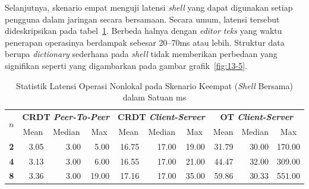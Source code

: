 Selanjutnya, skenario empat menguji latensi \textit{shell} yang dapat digunakan setiap pengguna dalam jaringan secara bersamaan. Secara umum, latensi tersebut dideskripsikan pada tabel~\ref{tab:latency-4}. Berbeda halnya dengan \textit{editor teks} yang waktu penerapan operasinya berdampak sebesar 20--70ms atau lebih. Struktur data berupa \textit{dictionary} sederhana pada \textit{shell} tidak memberikan perbedaan yang signifikan seperti yang digambarkan pada gambar grafik~\ref{fig:13-5}.

\begin{table}[H]
 \centering

 \caption{Statistik Latensi Operasi Nonlokal pada Skenario Keempat (\textit{Shell} Bersama) dalam Satuan ms}
 \label{tab:latency-4}
 \begin{tabular}{|c|rrr|rrr|rrr|}
  \hline
\multirow{2}{*}{$n$} & \multicolumn{3}{c|}{\textbf{CRDT \textit{Peer-To-Peer}}} & \multicolumn{3}{c|}{\textbf{CRDT \textit{Client-Server}}} & \multicolumn{3}{c|}{\textbf{OT \textit{Client-Server}}} \\ \cline{2-10}
 & \multicolumn{1}{c|}{Mean} & \multicolumn{1}{c|}{Median} & \multicolumn{1}{c|}{Max} & \multicolumn{1}{c|}{Mean} & \multicolumn{1}{c|}{Median} & \multicolumn{1}{c|}{Max} & \multicolumn{1}{c|}{Mean} & \multicolumn{1}{c|}{Median} & \multicolumn{1}{c|}{Max} \\ \hline
\textbf{2} & \multicolumn{1}{r|}{3.05} & \multicolumn{1}{r|}{3.00} & 5.00 & \multicolumn{1}{r|}{16.75} & \multicolumn{1}{r|}{17.00} & 19.00 & \multicolumn{1}{r|}{31.79} & \multicolumn{1}{r|}{30.00} & 170.00 \\ \hline
\textbf{4} & \multicolumn{1}{r|}{3.13} & \multicolumn{1}{r|}{3.00} & 6.00 & \multicolumn{1}{r|}{16.55} & \multicolumn{1}{r|}{17.00} & 21.00 & \multicolumn{1}{r|}{44.47} & \multicolumn{1}{r|}{32.00} & 309.00 \\ \hline
\textbf{8} & \multicolumn{1}{r|}{3.36} & \multicolumn{1}{r|}{3.00} & 19.00 & \multicolumn{1}{r|}{17.16} & \multicolumn{1}{r|}{17.00} & 35.00 & \multicolumn{1}{r|}{59.86} & \multicolumn{1}{r|}{30.33} & 551.00 \\ \hline
\end{tabular}
\end{table}

